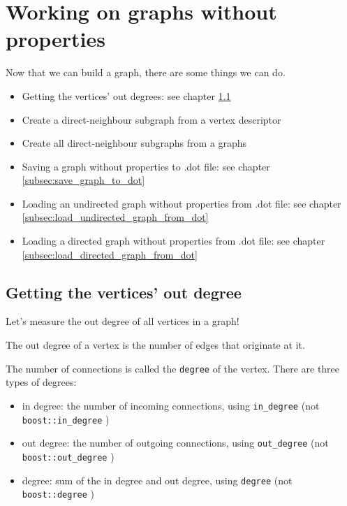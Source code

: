 \chapter{Working on graphs without properties}
\label{sec:Working-on-graphs-without-properties}

Now that we can build a graph, there are some things we can do.

\begin{itemize}
  \item
    Getting the vertices' out degrees: 
    see chapter \ref{subsec:get_vertex_out_degrees}
  \item
    Create a direct-neighbour subgraph from a vertex descriptor
  \item
    Create all direct-neighbour subgraphs from a graphs
  \item
    Saving a graph without properties to .dot file: 
    see chapter \ref{subsec:save_graph_to_dot}
  \item
    Loading an undirected graph without properties from .dot file: 
    see chapter \ref{subsec:load_undirected_graph_from_dot}
  \item
    Loading a directed graph without properties from .dot file: 
    see chapter \ref{subsec:load_directed_graph_from_dot}
\end{itemize}


\section{Getting the vertices' out degree}
\label{subsec:get_vertex_out_degrees}

Let's measure the out degree of all vertices in a graph! 

The out degree of a vertex is the number of edges that originate at it.

The number of connections is called the \verb;degree; of the vertex.
There are three types of degrees:

\begin{itemize}
  \item in degree: the number of incoming connections, 
    using \verb;in_degree; 
    (not \verb;boost::in_degree;  )
  \item out degree: the number of outgoing connections, 
    using \verb;out_degree; 
    (not \verb;boost::out_degree; )
  \item degree: sum of the in degree and out degree, 
    using \verb;degree; 
    (not \verb;boost::degree; )
\end{itemize}


